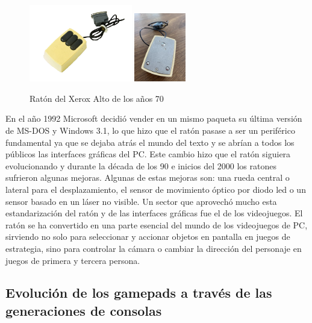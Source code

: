 \begin{figure}[!htb]
\begin{minipage}{0.9\textwidth}
    \centering
    \includegraphics[width=0.40\textwidth]{./Imagenes/Bitmap/mouse_xerox_alto(1).png}
    \includegraphics[width=0.20\textwidth]{./Imagenes/Bitmap/mouse_xerox_alto(2).jpg}
\end{minipage}
    \caption{Rat\'on del Xerox Alto de los a\~nos 70}
\label{Fig:xerox}
\end{figure}

En el a\~no 1992 Microsoft decidi\'o vender en un mismo paqueta su \'ultima versi\'on de MS-DOS y Windows 3.1, lo que hizo que el rat\'on pasase a ser un perif\'erico fundamental ya que se dejaba atr\'as el mundo del texto y se abr\'ian a todos los p\'ublicos las interfaces gr\'aficas del PC. Este cambio hizo que el rat\'on siguiera evolucionando y durante la d\'ecada de los 90 e inicios del 2000 los ratones sufrieron algunas mejoras. Algunas de estas mejoras son: una rueda central o lateral para el desplazamiento, el sensor de movimiento \'optico por diodo led o un sensor basado en un l\'aser no visible. Un sector que aprovech\'o mucho esta estandarizaci\'on del rat\'on y de las interfaces gr\'aficas fue el de los videojuegos. El rat\'on se ha convertido en una parte esencial del mundo de los videojuegos de PC, sirviendo no solo para seleccionar y accionar objetos en pantalla en juegos de estrategia, sino para controlar la c\'amara o cambiar la direcci\'on del personaje en juegos de primera y tercera persona.\\

\subsection{Evoluci\'on de los gamepads a trav\'es de las generaciones de consolas}

